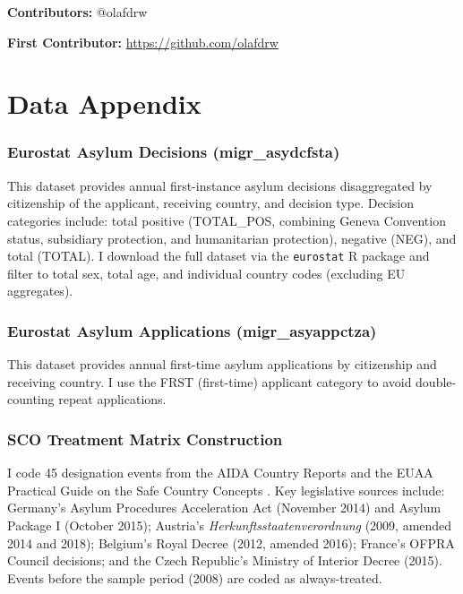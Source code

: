 \documentclass[12pt]{article}
\begin{document}
\noindent\textbf{Contributors:} @olafdrw

\noindent\textbf{First Contributor:} \url{https://github.com/olafdrw}

\label{apep_main_text_end}
\newpage


\newpage
\appendix

\section{Data Appendix}

\subsubsection*{Eurostat Asylum Decisions (migr\_asydcfsta)} This dataset provides annual first-instance asylum decisions disaggregated by citizenship of the applicant, receiving country, and decision type. Decision categories include: total positive (TOTAL\_POS, combining Geneva Convention status, subsidiary protection, and humanitarian protection), negative (NEG), and total (TOTAL). I download the full dataset via the \texttt{eurostat} R package and filter to total sex, total age, and individual country codes (excluding EU aggregates).

\subsubsection*{Eurostat Asylum Applications (migr\_asyappctza)} This dataset provides annual first-time asylum applications by citizenship and receiving country. I use the FRST (first-time) applicant category to avoid double-counting repeat applications.

\subsubsection*{SCO Treatment Matrix Construction} I code 45 designation events from the AIDA Country Reports \citep{aida2023country} and the EUAA Practical Guide on the Safe Country Concepts \citep{euaa2023guidance}. Key legislative sources include: Germany's Asylum Procedures Acceleration Act (November 2014) and Asylum Package I (October 2015); Austria's \textit{Herkunftsstaatenverordnung} (2009, amended 2014 and 2018); Belgium's Royal Decree (2012, amended 2016); France's OFPRA Council decisions; and the Czech Republic's Ministry of Interior Decree (2015). Events before the sample period (2008) are coded as always-treated.
\end{document}
